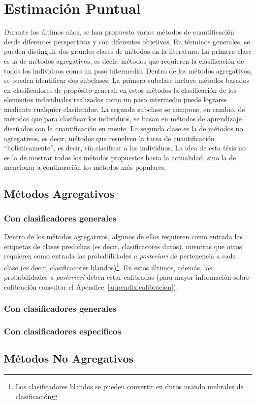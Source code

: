 \chapter{Estimación Puntual}

Durante los últimos años, se han propuesto varios métodos de cuantificación
desde diferentes perspectivas y con diferentes objetivos. En términos generales,
se pueden distinguir dos grandes clases de métodos en la literatura. La primera
clase es la de métodos agregativos, es decir, métodos que requieren la
clasificación de todos los individuos como un paso intermedio. Dentro de los
métodos agregativos, se pueden identificar dos subclases. La primera subclase
incluye métodos basados en clasificadores de propósito general; en estos métodos
la clasificación de los elementos individuales realizados como un paso
intermedio puede lograrse mediante cualquier clasificador. La segunda subclase
se compone, en cambio, de métodos que para clasificar los individuos, se basan
en métodos de aprendizaje diseñados con la cuantificación en mente. La segunda
clase es la de métodos no agregativos, es decir, métodos que resuelven la tarea
de cuantificación “holísticamente”, es decir, sin clasificar a los individuos.
La idea de esta tésis no es la de mostrar todos los métodos propuestos hasta la
actualidad, sino la de mencionar a continuación los métodos más populares.

\section{Métodos Agregativos}\label{puntual:agregativos}

\subsection{Con clasificadores generales}

Dentro de los métodos agregativos, algunos de ellos requieren como entrada las
etiquetas de clases predichas (es decir, clasificacores duros), mientras que
otros requieren como entrada las probabilidades {\it a posteriori\/} de
pertenencia a cada clase (es decir, clasificacores blandos)\footnote{Los
clasificadores blandos se pueden convertir en duros usando umbrales de
clasificación}. En estos últimos, además, las probabilidades {\it a
posteriori\/} deben estar calibradas (para mayor información sobre calibración
consultar el Apéndice~\ref{appendix:calibracion}).

\subsection{Con clasificadores generales}

\subsection{Con clasificadores específicos}

\section{Métodos No Agregativos}
